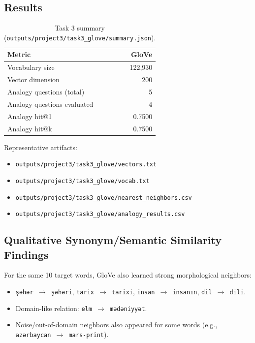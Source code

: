 \documentclass[11pt]{article}
\newcommand{\gloveVocab}{122{,}930}
\newcommand{\gloveDim}{200}
\newcommand{\gloveHitK}{0.7500}
\newcommand{\gloveEval}{4}
\begin{document}
\subsection{Results}
\begin{table}[H]
\centering
\begin{tabular}{lr}
\toprule
\textbf{Metric} & \textbf{GloVe} \\
\midrule
Vocabulary size & \gloveVocab \\
Vector dimension & \gloveDim \\
Analogy questions (total) & 5 \\
Analogy questions evaluated & \gloveEval \\
Analogy hit@1 & 0.7500 \\
Analogy hit@k & \gloveHitK \\
\bottomrule
\end{tabular}
\caption{Task 3 summary (\texttt{outputs/project3/task3\_glove/summary.json}).}
\label{tab:task3-summary}
\end{table}

Representative artifacts:
\begin{itemize}
    \item \texttt{outputs/project3/task3\_glove/vectors.txt}
    \item \texttt{outputs/project3/task3\_glove/vocab.txt}
    \item \texttt{outputs/project3/task3\_glove/nearest\_neighbors.csv}
    \item \texttt{outputs/project3/task3\_glove/analogy\_results.csv}
\end{itemize}

\subsection{Qualitative Synonym/Semantic Similarity Findings}
For the same 10 target words, GloVe also learned strong morphological neighbors:
\begin{itemize}
    \item \texttt{şəhər $\rightarrow$ şəhəri}, \texttt{tarix $\rightarrow$ tarixi}, \texttt{insan $\rightarrow$ insanın}, \texttt{dil $\rightarrow$ dili}.
    \item Domain-like relation: \texttt{elm $\rightarrow$ mədəniyyət}.
    \item Noise/out-of-domain neighbors also appeared for some words (e.g., \texttt{azərbaycan $\rightarrow$ mars-print}).
\end{itemize}
\end{document}

